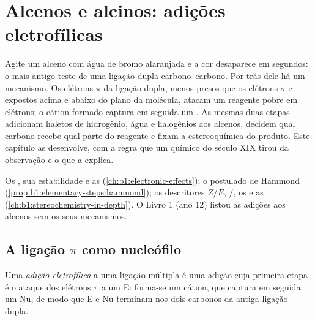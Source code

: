 \chapter{Alcenos e alcinos: adições eletrofílicas}\label{ch:b1:electrophilic-additions}

Agite um alceno com água de bromo alaranjada e a cor desaparece em
segundos: o mais antigo teste de uma ligação dupla carbono--carbono. Por
trás dele há um mecanismo. Os elétrons $\pi$ da ligação dupla, menos
presos que os elétrons $\sigma$ e expostos acima e abaixo do plano da
molécula, atacam um reagente pobre em elétrons; o cátion formado captura
em seguida um . As mesmas duas etapas adicionam haletos de
hidrogênio, água e halogênios aos alcenos, decidem qual carbono recebe
qual parte do reagente e fixam a estereoquímica do produto. Este capítulo
as desenvolve, com a regra que um químico do século XIX tirou da
observação e o  que a explica.

\begin{recall}
Os , sua estabilidade e as  (\cref{ch:b1:electronic-effects});
o postulado de Hammond (\cref{prop:b1:elementary-steps:hammond}); os
descritores $Z$/$E$, /, os  e as  (\cref{ch:b1:stereochemistry-in-depth}). O Livro 1 (ano 12)
listou as adições aos alcenos sem os seus mecanismos.
\end{recall}

\section{A ligação \texorpdfstring{$\pi$}{pi} como nucleófilo}

\begin{definition}\label{def:b1:electrophilic-additions:electrophilic-addition}
Uma \emph{adição eletrofílica} a uma
ligação múltipla é uma adição cuja primeira etapa é o ataque dos
elétrons $\pi$ a um  E: forma-se um cátion, que captura em
seguida um  Nu, de modo que E e Nu terminam nos dois carbonos
da antiga ligação dupla.
\end{definition}


